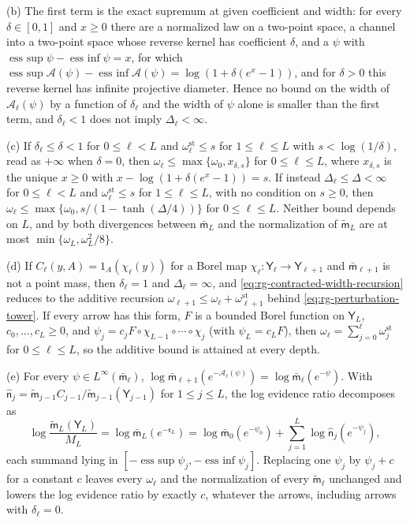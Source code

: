 (b) The first term is the exact supremum at given coefficient and width: for every
$\delta\in[0,1]$ and $x\ge0$ there are a normalized law on a two-point space, a
channel into a two-point space whose reverse kernel has coefficient $\delta$, and a
$\psi$ with $\operatorname*{ess~sup}\psi-\operatorname*{ess~inf}\psi=x$, for which
$\operatorname*{ess~sup}\mathcal A(\psi)-\operatorname*{ess~inf}\mathcal
A(\psi)=\log(1+\delta(e^x-1))$, and for $\delta>0$ this reverse kernel has infinite
projective diameter. Hence no bound on the width of $\mathcal A_\ell(\psi)$ by a
function of $\delta_\ell$ and the width of $\psi$ alone is smaller than the first
term, and $\delta_\ell<1$ does not imply $\Delta_\ell<\infty$.

(c) If $\delta_\ell\le\delta<1$ for $0\le\ell<L$ and
$\omega^{\mathrm{st}}_\ell\le s$ for $1\le\ell\le L$ with $s<\log(1/\delta)$, read as
$+\infty$ when $\delta=0$, then $\omega_\ell\le\max\{\omega_0,x_{\delta,s}\}$ for
$0\le\ell\le L$, where $x_{\delta,s}$ is the unique $x\ge0$ with
$x-\log(1+\delta(e^x-1))=s$. If instead $\Delta_\ell\le\Delta<\infty$ for
$0\le\ell<L$ and $\omega^{\mathrm{st}}_\ell\le s$ for $1\le\ell\le L$, with no
condition on $s\ge0$, then
$\omega_\ell\le\max\{\omega_0,s/(1-\tanh(\Delta/4))\}$ for $0\le\ell\le L$. Neither bound depends on $L$, and by
 both divergences between
$\bar{\mathsf m}_L$ and the normalization of $\widetilde{\mathsf m}_L$ are at most
$\min\{\omega_L,\omega_L^2/8\}$.

(d) If $C_\ell(y,A)=1_A(\chi_\ell(y))$ for a Borel map
$\chi_\ell:\mathsf Y_\ell\to\mathsf Y_{\ell+1}$ and $\bar{\mathsf m}_{\ell+1}$ is not
a point mass, then $\delta_\ell=1$ and $\Delta_\ell=\infty$, and
\eqref{eq:rg-contracted-width-recursion} reduces to the additive recursion
$\omega_{\ell+1}\le\omega_\ell+\omega^{\mathrm{st}}_{\ell+1}$ behind
\eqref{eq:rg-perturbation-tower}. If every arrow has this form, $F$ is a bounded
Borel function on $\mathsf Y_L$, $c_0,\ldots,c_L\ge0$, and
$\psi_j=c_jF\circ\chi_{L-1}\circ\cdots\circ\chi_j$ (with $\psi_L=c_LF$), then
$\omega_\ell=\sum_{j=0}^{\ell}\omega^{\mathrm{st}}_j$ for $0\le\ell\le L$, so the
additive bound is attained at every depth.

(e) For every $\psi\in L^\infty(\bar{\mathsf m}_\ell)$,
$\log\bar{\mathsf m}_{\ell+1}(e^{-\mathcal A_\ell(\psi)})=\log\bar{\mathsf m}_\ell(e^{-\psi})$.
With $\widehat{\mathsf n}_j=\widetilde{\mathsf m}_{j-1}C_{j-1}/\widetilde{\mathsf
m}_{j-1}(\mathsf Y_{j-1})$ for $1\le j\le L$, the log evidence ratio decomposes as
\begin{equation}
\log\frac{\widetilde{\mathsf m}_L(\mathsf Y_L)}{M_L}
=\log\bar{\mathsf m}_L(e^{-\mathfrak r_L})
=\log\bar{\mathsf m}_0(e^{-\psi_0})+\sum_{j=1}^{L}\log\widehat{\mathsf n}_j(e^{-\psi_j}),
\label{eq:rg-tower-offset-decomposition}
\end{equation}
each summand lying in
$[-\operatorname*{ess~sup}\psi_j,-\operatorname*{ess~inf}\psi_j]$. Replacing one
$\psi_j$ by $\psi_j+c$ for a constant $c$ leaves every $\omega_\ell$ and the
normalization of every $\widetilde{\mathsf m}_\ell$ unchanged and lowers the log evidence
ratio by exactly $c$, whatever the arrows, including arrows with $\delta_\ell=0$.

